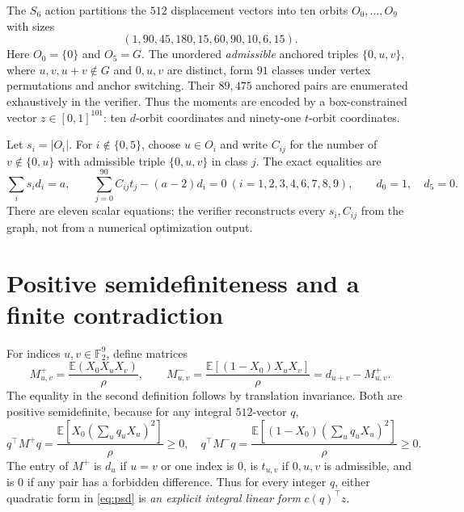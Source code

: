 \documentclass[11pt,a4paper]{article}
\newcommand{\F}{\mathbb F}
\begin{document}
The $S_6$ action partitions the $512$ displacement vectors into ten orbits $O_0,\dots,O_9$ with sizes
\[
(1,90,45,180,15,60,90,10,6,15).
\]
Here $O_0=\{0\}$ and $O_5=G$. The unordered \emph{admissible} anchored triples $\{0,u,v\}$, where $u,v,u+v\notin G$ and $0,u,v$ are distinct, form $91$ classes under vertex permutations and anchor switching. Their $89{,}475$ anchored pairs are enumerated exhaustively in the verifier. Thus the moments are encoded by a box-constrained vector $z\in[0,1]^{101}$: ten $d$-orbit coordinates and ninety-one $t$-orbit coordinates.

Let $s_i=|O_i|$. For $i\notin\{0,5\}$, choose $u\in O_i$ and write $C_{ij}$ for the number of $v\notin\{0,u\}$ with admissible triple $\{0,u,v\}$ in class $j$. The exact equalities are
\begin{equation}\label{eq:eqsys}
\sum_i s_i d_i=a,\qquad
\sum_{j=0}^{90} C_{ij}t_j-(a-2)d_i=0\ (i=1,2,3,4,6,7,8,9),
\qquad d_0=1,\quad d_5=0.
\end{equation}
There are eleven scalar equations; the verifier reconstructs every $s_i,C_{ij}$ from the graph, not from a numerical optimization output.

\section{Positive semidefiniteness and a finite contradiction}
For indices $u,v\in\F_2^9$, define matrices
\[
M^+_{u,v}=\frac{\mathbb E(X_0X_uX_v)}{\rho},\qquad
M^-_{u,v}=\frac{\mathbb E[(1-X_0)X_uX_v]}{\rho}=d_{u+v}-M^+_{u,v}.
\]
The equality in the second definition follows by translation invariance. Both are positive semidefinite, because for any integral $512$-vector $q$,
\begin{equation}\label{eq:psd}
q^\top M^+q=\frac{\mathbb E\left[X_0(\sum_u q_uX_u)^2\right]}{\rho}\ge0,\quad
q^\top M^-q=\frac{\mathbb E\left[(1-X_0)(\sum_u q_uX_u)^2\right]}{\rho}\ge0.
\end{equation}
The entry of $M^+$ is $d_u$ if $u=v$ or one index is $0$, is $t_{u,v}$ if $0,u,v$ is admissible, and is $0$ if any pair has a forbidden difference. Thus for every integer $q$, either quadratic form in \eqref{eq:psd} is \emph{an explicit integral linear form} $c(q)^\top z$.
\end{document}
